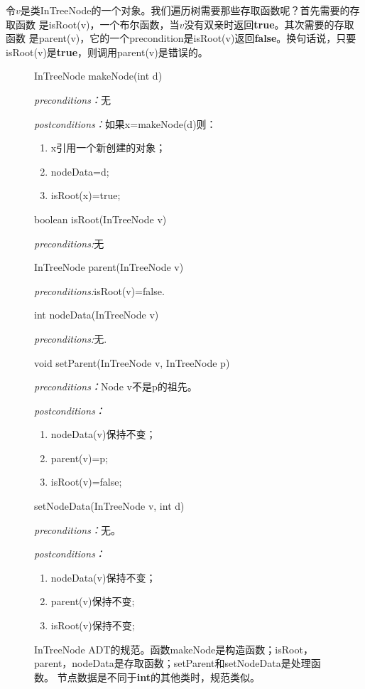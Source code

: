 令$v$是类InTreeNode的一个对象。我们遍历树需要那些存取函数呢？首先需要的存取函数
是isRoot(v)，一个布尔函数，当$v$没有双亲时返回\textbf{true}。其次需要的存取函数
是parent(v)，它的一个precondition是isRoot(v)返回\textbf{false}。换句话说，只要
isRoot(v)是\textbf{true}，则调用parent(v)是错误的。

\begin{figure*}[!t]
\colorbox[rgb]{0.9, 0.9, 0.9}{InTreeNode makeNode(int d)}

\emph{preconditions：}无

\emph{postconditions：}如果x=makeNode(d)则：
\begin{enumerate}
\item x引用一个新创建的对象；
\item nodeData=d;
\item isRoot(x)=true;
\end{enumerate}

\colorbox[rgb]{0.9, 0.9, 0.9}{boolean isRoot(InTreeNode v)}

\emph{preconditions:}无

\colorbox[rgb]{0.9, 0.9, 0.9}{InTreeNode parent(InTreeNode v)}

\emph{preconditions:}isRoot(v)=false.

\colorbox[rgb]{0.9, 0.9, 0.9}{int nodeData(InTreeNode v)}

\emph{preconditions:}无.

\colorbox[rgb]{0.9, 0.9, 0.9}{void setParent(InTreeNode v, InTreeNode p)}

\emph{preconditions：}Node v不是p的祖先。

\emph{postconditions：}
\begin{enumerate}
\item nodeData(v)保持不变；
\item parent(v)=p;
\item isRoot(v)=false;
\end{enumerate}

\colorbox[rgb]{0.9, 0.9, 0.9}{setNodeData(InTreeNode v, int d)}

\emph{preconditions：}无。

\emph{postconditions：}
\begin{enumerate}
\item nodeData(v)保持不变；
\item parent(v)保持不变;
\item isRoot(v)保持不变;
\end{enumerate}

    \caption{InTreeNode ADT的规范。函数makeNode是构造函数；isRoot，
            parent，nodeData是存取函数；setParent和setNodeData是处理函数。
            节点数据是不同于\textbf{int}的其他类时，规范类似。}
    \label{Fig:InTreeADTSpecification}
\end{figure*}

